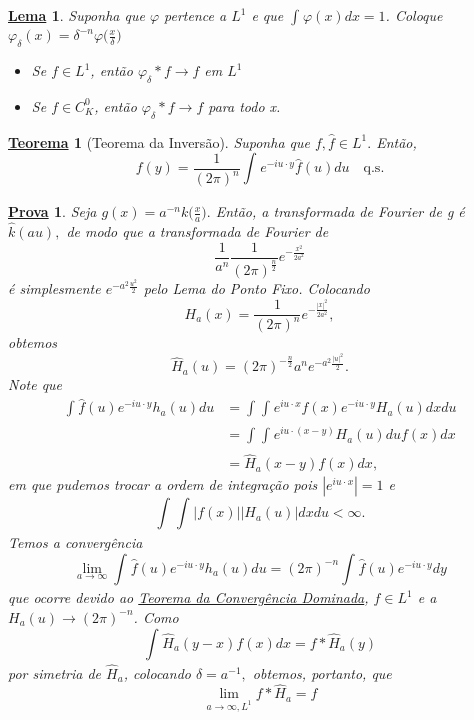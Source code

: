 \documentclass{article}
\newtheorem*{theorem*}{\underline{Teorema}}
\newtheorem*{lemma*}{\underline{Lema}}
\newtheorem*{proof*}{\underline{Prova}}
\begin{document}
 \begin{lemma*}
   Suponha que \(\varphi \) pertence a \(L^{1}\) e que \(\int_{}^{}\varphi (x)dx = 1\). Coloque \(\varphi_{\delta }(x) = \delta ^{-n}\varphi \biggl(\frac{x}{\delta }\biggr)\)
  \begin{itemize}
    \item[1)] Se \(f\in L^{1}\), então \(\varphi_\delta * f\to f\) em \(L^{1}\)
      \item[2)] Se \(f\in C_{K}^{0}\), então \(\varphi_{\delta }*f\to f\) para todo x.
  \end{itemize}
 \end{lemma*}
 \hypertarget{inversion}{
   \begin{theorem*}[Teorema da Inversão]
    Suponha que \(f, \hat{f}\in L^{1}.\) Então,
      \[
        f(y) = \frac{1}{(2\pi )^{n}}\int_{}^{}e^{-iu \cdot y}\hat{f}(u)du \quad \text{q.s.}
      \]
\end{theorem*}}
 \begin{proof*}
   Seja \(g(x) = a^{-n}k \biggl(\frac{x}{a}\biggr).\) Então, a transformada de Fourier de g é \(\hat{k}(au),\) de modo que a transformada de Fourier de 
     \[
       \frac{1}{a^{n}}\frac{1}{(2\pi )^{\frac{n}{2}}}e^{-\frac{x^{2}}{2a^{2}}}
     \]
  é simplesmente \(e^{-a^{2}\frac{u^{2}}{2}}\) pelo Lema do Ponto Fixo. Colocando 
    \[
      H_{a}(x) = \frac{1}{(2\pi )^{n}}e^{-\frac{|x|^{2}}{2a^{2}}},
    \]
  obtemos 
    \[
      \hat{H}_{a}(u) = (2\pi )^{-\frac{n}{2}}a^{n}e^{-a^{2}\frac{|u|^{2}}{2}}.
    \]
  Note que 
 \begin{align*}
   \int_{}^{}\hat{f}(u)e^{-iu \cdot y}h_{a}(u)du &= \int_{}^{}\int_{}^{}e^{iu \cdot x}f(x)e^{-iu \cdot y}H_{a}(u)dxdu \\ 
                                                 &= \int_{}^{}\int_{}^{}e^{iu \cdot (x-y)}H_{a}(u)duf(x)dx\\ 
                                                 &= \hat{H}_{a}(x-y)f(x)dx,
 \end{align*}
 em que pudemos trocar a ordem de integração pois \(|e^{iu \cdot x}| = 1\) e 
   \[
     \int_{}^{}\int_{}^{}|f(x)||H_a(u)|dxdu < \infty.
   \]
   Temos a convergência
    \[
      \lim_{a\to \infty}\int_{}^{}\hat{f}(u)e^{-iu \cdot y}h_{a}(u)du =(2\pi )^{-n}\int_{}^{}\hat{f}(u)e^{-iu \cdot y}dy
    \]
    que ocorre devido ao \hyperlink{dominated_convergence}{\textit{Teorema da Convergência Dominada}}, \(\hat{f}\in L^{1}\) e a \(H_{a}(u)\to (2\pi )^{-n}\). Como 
      \[
        \int_{}^{}\hat{H}_{a}(y-x)f(x)dx = f*\hat{H}_{a}(y)
      \]
    por simetria de \(\hat{H}_{a}\), colocando \(\delta  = a^{-1},\) obtemos, portanto, que 
      \[
        \lim_{a\to \infty, L^{1}}f*\hat{H}_{a} = f
      \]
 \end{proof*}
\end{document}
